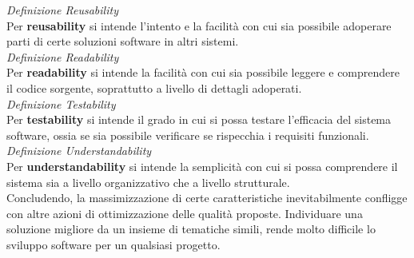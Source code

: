 \documentclass{article}
\begin{document}
\textit{Definizione Reusability}\\
Per \textbf{reusability} si intende l'intento e la facilità con cui sia possibile adoperare parti di certe soluzioni software in altri sistemi.\vspace*{14pt}\\
\textit{Definizione Readability}\\
Per \textbf{readability} si intende la facilità con cui sia possibile leggere e comprendere il codice sorgente, soprattutto a livello di dettagli adoperati.\vspace*{14pt}\\
\textit{Definizione Testability}\\
Per \textbf{testability} si intende il grado in cui si possa testare l'efficacia del sistema software, ossia se sia possibile verificare se rispecchia i requisiti funzionali.\vspace*{14pt}\\
\textit{Definizione Understandability}\\
Per \textbf{understandability} si intende la semplicità con cui si possa comprendere il sistema sia a livello organizzativo che a livello strutturale.\vspace*{14pt}\\
Concludendo, la massimizzazione di certe caratteristiche inevitabilmente confligge con altre azioni di ottimizzazione delle qualità proposte. Individuare una soluzione migliore da un insieme di tematiche simili, rende molto difficile lo sviluppo software per un qualsiasi progetto. 
\end{document}
